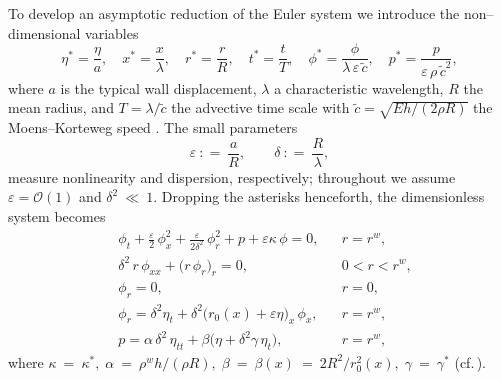 \documentclass[alpha-refs, 12pt]{wiley-article}
\renewcommand{\O}{\mathcal{O}}
\newcommand{\eqdef}{\mathrel{\mathop:}=}
\begin{document}
To develop an asymptotic reduction of the Euler system we introduce the non–dimensional variables
\begin{equation}\label{eq:ndv}
  \eta^{\ast}=\frac{\eta}{a},\quad
  x^{\ast}=\frac{x}{\lambda},\quad
  r^{\ast}=\frac{r}{R},\quad
  t^{\ast}=\frac{t}{T},\quad
  \phi^{\ast}=\frac{\phi}{\lambda\,\varepsilon\,\tilde{c}},\quad
  p^{\ast}=\frac{p}{\varepsilon\,\rho\,\tilde{c}^{2}},
\end{equation}
where $a$ is the typical wall displacement, $\lambda$ a characteristic wavelength, $R$ the mean radius, and $T=\lambda/\tilde{c}$ the advective time scale with
\(
  \tilde{c}=\sqrt{E h/(2\rho R)}
\)
the Moens--Korteweg speed \cite{Fung2013}. The small parameters
\begin{equation}\label{eq:eps_del}
  \varepsilon\ \eqdef\ \frac{a}{R}, \qquad \delta\ \eqdef\ \frac{R}{\lambda},
\end{equation}
measure nonlinearity and dispersion, respectively; throughout we assume $\varepsilon = \O(1)$ and $\delta^{2}\ \ll\ 1$. Dropping the asterisks henceforth, the dimensionless system becomes
\begin{align}
  & \phi_{t}
    +\tfrac{\varepsilon}{2}\,\phi_{x}^{2}
    +\tfrac{\varepsilon}{2\delta^{2}}\,
     \phi_{r}^{2}
    +p
    +\varepsilon\kappa\,\phi
    =0,
    && r=r^{w}, \label{eq1}\\[2pt]
  & \delta^{2}\,r\,\phi_{xx}
    +\bigl(r\,\phi_{r}\bigr)_{r}
    =0,
    && 0<r<r^{w}, \label{eq2}\\[2pt]
  & \phi_{r}=0,
    && r=0, \label{eq3}\\[2pt]
  & \phi_{r}
    =\delta^{2}\eta_{t}
     +\delta^{2}\bigl(r_{0}(x)+\varepsilon\eta\bigr)_{x}\,\phi_{x},
    && r=r^{w}, \label{eq4}\\[2pt]
  & p
    =\alpha\,\delta^{2}\,\eta_{tt}
     +\beta\bigl(\eta+\delta^{2}\gamma\,\eta_{t}\bigr),
    && r=r^{w}, \label{eq5}
\end{align}
where
\(
  \kappa\ =\ \kappa^{\ast},\;
  \alpha\ =\ \rho^{w}h/(\rho R),\;
  \beta\ =\ \beta(x)\ =\ 2R^{2}/r_{0}^{2}(x),\;
  \gamma\ =\ \gamma^{\ast}
\)
(cf.\,\cite{Mitsotakis2019}).
\end{document}
